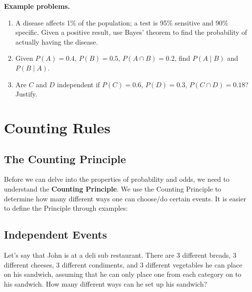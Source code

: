 \textbf{Example problems.}
\begin{enumerate}
    \item A disease affects 1\% of the population; a test is 95\%
          sensitive and 90\% specific. Given a positive result, use
          Bayes' theorem to find the probability of actually having the
          disease.
    \item Given $P(A)=0.4$, $P(B)=0.5$, $P(A\cap B)=0.2$, find
          $P(A\mid B)$ and $P(B\mid A)$.
    \item Are $C$ and $D$ independent if $P(C)=0.6$, $P(D)=0.3$,
          $P(C\cap D)=0.18$? Justify.
\end{enumerate}



\section{Counting Rules}
\label{sec:coun-e634}



\subsection{The Counting Principle}
\label{sss:thec-5230}




Before we can delve into the properties of probability and odds, we need to understand the
\textbf{Counting Principle}. We use the Counting Principle to determine how many different
ways one can choose/do certain events. It is easier to define the Principle through
examples:




\subsection{Independent Events}
\label{sss:inde-adc5}




Let's say that John is at a deli sub restaurant. There are 3 different breads, 3 different
cheeses, 3 different condiments, and 3 different vegetables he can place on his sandwich,
assuming that he can only place one from each category on to his sandwich. How many
different ways can he set up his sandwich?



